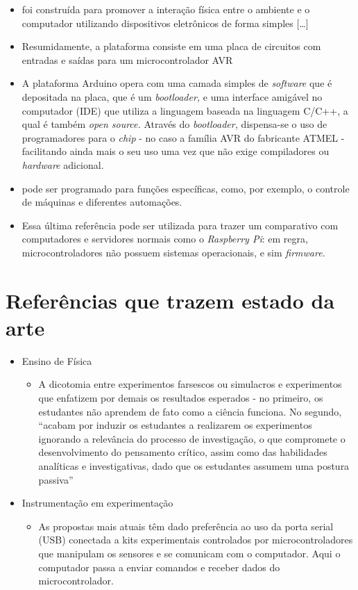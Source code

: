 \documentclass{article}
\begin{document}
\begin{itemize}
\begin{itemize}
		\item [\dots]  foi construída para promover a interação física entre o ambiente e o computador utilizando dispositivos eletrônicos de forma simples [\dots] \cite{iniciantes}
		\item Resumidamente, a plataforma consiste em uma placa de circuitos com entradas e saídas para um microcontrolador AVR \cite{iniciantes}
		\item A plataforma Arduino opera com uma camada simples de \textit{software} que é depositada na placa, que é um \textit{bootloader,} e uma interface amigável no computador (IDE) que utiliza a linguagem baseada na linguagem C/C++, a qual é também \textit{open source.} Através do \textit{bootloader,} dispensa-se o uso de programadores para o \textit{chip} - no caso a família AVR do fabricante ATMEL - facilitando ainda mais o seu uso uma vez que não exige compiladores ou \textit{hardware} adicional. \cite{newton}
	\item [\dots] pode ser programado para funções específicas, como, por exemplo, o controle de máquinas e diferentes automações. \cite{iniciantes}
		\item Essa última referência pode ser utilizada para trazer um comparativo com computadores e servidores normais como o \textit{Raspberry Pi}: em regra, microcontroladores não possuem sistemas operacionais, e sim \textit{firmware.}
	\end{itemize}
\end{itemize}

\section{Referências que trazem estado da arte}
\begin{itemize}
	\item{Ensino de Física}
	\begin{itemize}
		\item A dicotomia entre experimentos farsescos ou simulacros e experimentos que enfatizem por demais os resultados esperados - no primeiro, os estudantes não aprendem de fato como a ciência funciona. No segundo, ``acabam por induzir os estudantes a realizarem os experimentos ignorando a relevância do processo de investigação, o que compromete o desenvolvimento do pensamento crítico, assim como das habilidades analíticas e investigativas, dado que os estudantes assumem uma postura passiva'' \cite{rogerio}
	\end{itemize}
	\item Instrumentação em experimentação
	\begin{itemize}
		\item As propostas mais atuais têm dado preferência ao uso da porta serial (USB) conectada a kits experimentais controlados por microcontroladores que manipulam os sensores e se comunicam com o computador. Aqui o computador passa a enviar comandos e receber dados do microcontrolador. \cite{kit}
	\end{itemize}
\end{itemize}
\end{document}
